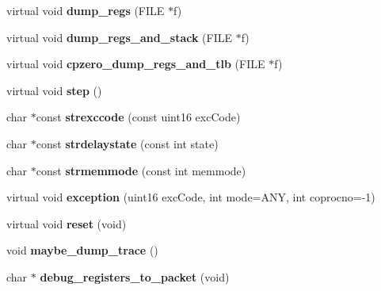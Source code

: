\begin{DoxyCompactItemize}
\item 
\hypertarget{classCPU_aaeb5869fd90b6462918d3d116332d8b5}{
virtual void {\bfseries dump\_\-regs} (FILE $\ast$f)}
\label{classCPU_aaeb5869fd90b6462918d3d116332d8b5}

\item 
\hypertarget{classCPU_ae24bbf9f230ba35d3d11d00e7e449dff}{
virtual void {\bfseries dump\_\-regs\_\-and\_\-stack} (FILE $\ast$f)}
\label{classCPU_ae24bbf9f230ba35d3d11d00e7e449dff}

\item 
\hypertarget{classCPU_af737d7d7d3c78fdae2e614787289ffad}{
virtual void {\bfseries cpzero\_\-dump\_\-regs\_\-and\_\-tlb} (FILE $\ast$f)}
\label{classCPU_af737d7d7d3c78fdae2e614787289ffad}

\item 
\hypertarget{classCPU_af4f84a4193a44aeef676abe4402b8c71}{
virtual void {\bfseries step} ()}
\label{classCPU_af4f84a4193a44aeef676abe4402b8c71}

\item 
\hypertarget{classCPU_acff6e2d8359b7ebea9153ea30b6c7596}{
char $\ast$const {\bfseries strexccode} (const uint16 excCode)}
\label{classCPU_acff6e2d8359b7ebea9153ea30b6c7596}

\item 
\hypertarget{classCPU_a7849dd448a89f9a7ca3f247ed2b9d757}{
char $\ast$const {\bfseries strdelaystate} (const int state)}
\label{classCPU_a7849dd448a89f9a7ca3f247ed2b9d757}

\item 
\hypertarget{classCPU_a5cc22e9cb5a61f8d0c2b226883974e15}{
char $\ast$const {\bfseries strmemmode} (const int memmode)}
\label{classCPU_a5cc22e9cb5a61f8d0c2b226883974e15}

\item 
\hypertarget{classCPU_a585862b2d962819486be215064fce20e}{
virtual void {\bfseries exception} (uint16 excCode, int mode=ANY, int coprocno=-\/1)}
\label{classCPU_a585862b2d962819486be215064fce20e}

\item 
\hypertarget{classCPU_a01e04d32f15a7812673db7fda78c3f33}{
virtual void {\bfseries reset} (void)}
\label{classCPU_a01e04d32f15a7812673db7fda78c3f33}

\item 
\hypertarget{classCPU_ae85238b9e47bee2df7a07eef2cba3e80}{
void {\bfseries maybe\_\-dump\_\-trace} ()}
\label{classCPU_ae85238b9e47bee2df7a07eef2cba3e80}

\item 
\hypertarget{classCPU_a7ab194fa6e72e7941646f095df76bff8}{
char $\ast$ {\bfseries debug\_\-registers\_\-to\_\-packet} (void)}
\label{classCPU_a7ab194fa6e72e7941646f095df76bff8}


\end{DoxyCompactItemize}
